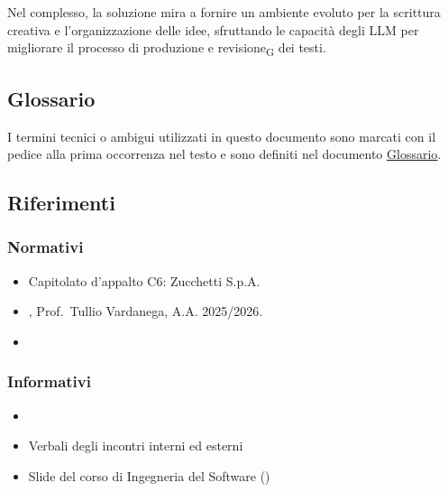Nel complesso, la soluzione mira a fornire un ambiente evoluto per la scrittura creativa e l’organizzazione delle idee, sfruttando le capacità degli LLM per migliorare il processo di produzione e revisione\textsubscript{G} dei testi.

\subsection{Glossario}
 
I termini tecnici o ambigui utilizzati in questo documento sono marcati con il pedice alla prima occorrenza nel testo e sono definiti nel
documento \href{https://synergo-unit-unipd.github.io/Second-Brain/docs/RTB/doc_gestionali/doc_interni/glossario/glossario.pdf}
     {\underline{Glossario}}.
 

\subsection{Riferimenti}
\subsubsection{Normativi}
\begin{itemize}
	\item Capitolato d'appalto C6:
             {Zucchetti S.p.A.}
  	\item {}, Prof.\ Tullio Vardanega,
        A.A. 2025/2026. 
	\item {}
\end{itemize}

\subsubsection{Informativi}
\begin{itemize}
	\item {}
	\item Verbali degli incontri interni ed esterni
	\item Slide del corso di Ingegneria del Software ()
\end{itemize}

